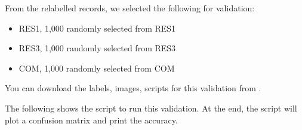 \documentclass[letterpaper,10pt,english]{sphinxmanual}
\begin{document}
\sphinxAtStartPar
From the relabelled records, we selected the following for validation:
\begin{itemize}
\item {} 
\sphinxAtStartPar
RES1,    1,000 randomly selected from RES1

\item {} 
\sphinxAtStartPar
RES3,    1,000 randomly selected from RES3

\item {} 
\sphinxAtStartPar
COM,    1,000 randomly selected from COM

\end{itemize}

\sphinxAtStartPar
You can download the labels, images, scripts for this validation from .

\sphinxAtStartPar
The following shows the script to run this validation.
At the end, the script will plot a confusion matrix and print the accuracy.
\end{document}
